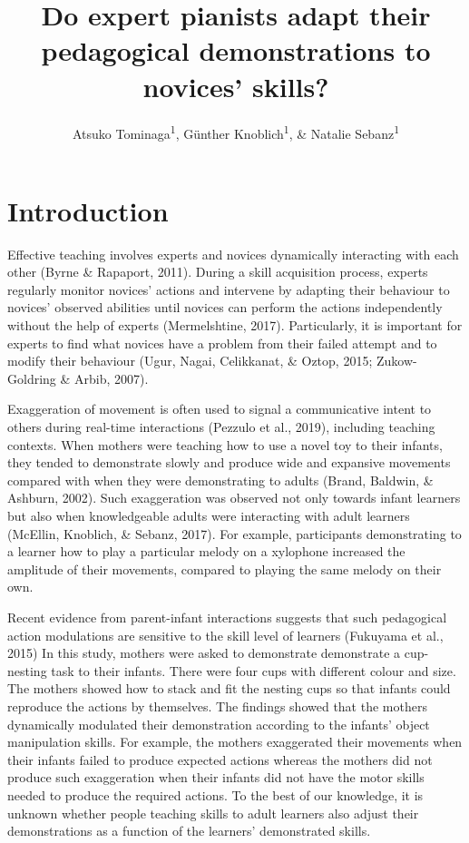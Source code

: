 \documentclass[
  man,floatsintext]{apa6}
\title{Do expert pianists adapt their pedagogical demonstrations to novices' skills?}
\author{Atsuko Tominaga\textsuperscript{1}, Günther Knoblich\textsuperscript{1}, \& Natalie Sebanz\textsuperscript{1}}
\date{}
\affiliation{\vspace{0.5cm}\textsuperscript{1} Department of Cognitive Science, Central European University}
\begin{document}
\maketitle

\hypertarget{introduction}{%
\section{Introduction}\label{introduction}}

Effective teaching involves experts and novices dynamically interacting with each other (Byrne \& Rapaport, 2011). During a skill acquisition process, experts regularly monitor novices' actions and intervene by adapting their behaviour to novices' observed abilities until novices can perform the actions independently without the help of experts (Mermelshtine, 2017). Particularly, it is important for experts to find what novices have a problem from their failed attempt and to modify their behaviour (Ugur, Nagai, Celikkanat, \& Oztop, 2015; Zukow-Goldring \& Arbib, 2007).

Exaggeration of movement is often used to signal a communicative intent to others during real-time interactions (Pezzulo et al., 2019), including teaching contexts. When mothers were teaching how to use a novel toy to their infants, they tended to demonstrate slowly and produce wide and expansive movements compared with when they were demonstrating to adults (Brand, Baldwin, \& Ashburn, 2002). Such exaggeration was observed not only towards infant learners but also when knowledgeable adults were interacting with adult learners (McEllin, Knoblich, \& Sebanz, 2017). For example, participants demonstrating to a learner how to play a particular melody on a xylophone increased the amplitude of their movements, compared to playing the same melody on their own.

Recent evidence from parent-infant interactions suggests that such pedagogical action modulations are sensitive to the skill level of learners (Fukuyama et al., 2015) In this study, mothers were asked to demonstrate demonstrate a cup-nesting task to their infants. There were four cups with different colour and size. The mothers showed how to stack and fit the nesting cups so that infants could reproduce the actions by themselves. The findings showed that the mothers dynamically modulated their demonstration according to the infants' object manipulation skills. For example, the mothers exaggerated their movements when their infants failed to produce expected actions whereas the mothers did not produce such exaggeration when their infants did not have the motor skills needed to produce the required actions. To the best of our knowledge, it is unknown whether people teaching skills to adult learners also adjust their demonstrations as a function of the learners' demonstrated skills.
\end{document}
